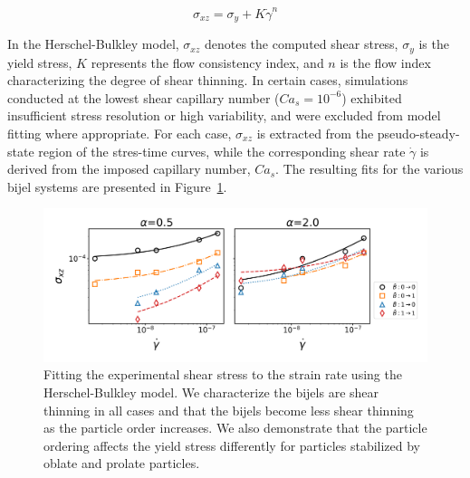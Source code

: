 \begin{equation}
    \sigma_{xz} = \sigma_{y} + K\dot{\gamma}^{n}    
\end{equation}

In the Herschel-Bulkley model, $\sigma_{xz}$ denotes the computed shear stress, $\sigma_y$ is the yield stress, $K$ represents the flow consistency index, 
and $n$ is the flow index characterizing the degree of shear thinning. In certain cases, simulations conducted at the lowest shear capillary number 
($Ca_s = 10^{-6}$) exhibited insufficient stress resolution or high variability, and were excluded from model fitting where appropriate. For each case, 
$\sigma_{xz}$ is extracted from the pseudo-steady-state region of the stres-time curves, while the corresponding shear rate $\dot{\gamma}$ is derived from 
the imposed capillary number, $Ca_s$. The resulting fits for the various bijel systems are presented in Figure~\ref{fig:stress_strain}.

\begin{figure} 
    \centering 
    \includegraphics[scale=0.5]{../figures/results/paper3/stress_strain-all.png} 
    \caption{Fitting the experimental shear stress to the strain rate using the Herschel-Bulkley model. We characterize the bijels are 
             shear thinning in all cases and that the bijels become less shear thinning as the particle order increases. We also
             demonstrate that the particle ordering affects the yield stress differently for particles stabilized by oblate and 
             prolate particles.} 
    \label{fig:stress_strain} 
\end{figure}

